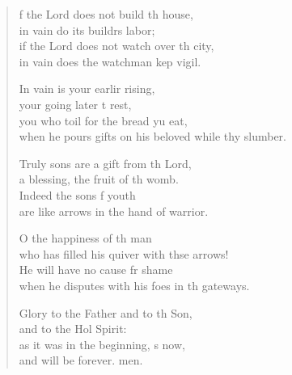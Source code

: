 \settowidth{\versewidth}{when he pours gifts on his beloved while they slumber.}
\begin{verse}%
  \begin{patverse}
f the Lord does not build th house,\Med\\
in vain do its buildrs labor;\\
if the Lord does not watch over th city,\Med\\
in vain does the watchman kep vigil.

In vain is your earlir rising,\Med\\
your going later t rest,\\
you who toil for the bread yu eat,\Med\\
when he pours gifts on his beloved while thy slumber.

Truly sons are a gift from th Lord,\Med\\
a blessing, the fruit of th womb.\\
Indeed the sons f youth\Med\\
are like arrows in the hand of  warrior.

O the happiness of th man\Med\\
who has filled his quiver with thse arrows!\\
He will have no cause fr shame\Med\\
when he disputes with his foes in th gateways.

Glory to the Father and to th Son,\Med\\
and to the Hol Spirit:\\
as it was in the beginning, \pointup{\i}s now,\Med\\
and will be forever. men. 
  \end{patverse}
\end{verse}
